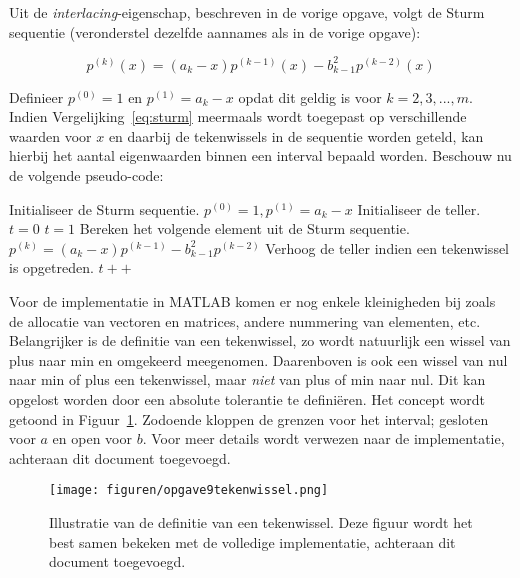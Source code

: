 \documentclass[a4paper, 12pt, titlepage]{report}
\begin{document}
Uit de \emph{interlacing}-eigenschap, beschreven in de vorige opgave, volgt de Sturm sequentie (veronderstel dezelfde aannames als in de vorige opgave):

\begin{equation}
	p^{(k)}(x) = (a_k - x)p^{(k-1)}(x)-b_{k-1}^{2}p^{(k-2)}(x)
	\label{eq:sturm}
\end{equation}

Definieer $p^{(0)}=1$ en $p^{(1)}=a_k-x$ opdat dit geldig is voor $k = 2,3,...,m$. Indien Vergelijking~\ref{eq:sturm} meermaals wordt toegepast op verschillende waarden voor $x$ en daarbij de tekenwissels in de sequentie worden geteld, kan hierbij het aantal eigenwaarden binnen een interval bepaald worden. Beschouw nu de volgende pseudo-code:\\

\begin{algorithmic}
\STATE Initialiseer de Sturm sequentie.
\STATE $p^{(0)}=1, p^{(1)}=a_k-x$
\STATE Initialiseer de teller.
\STATE $t = 0$
\STATE $t = 1$
\ENDIF	
{}
\STATE Bereken het volgende element uit de Sturm sequentie.
\STATE $p^{(k)} = (a_k - x)p^{(k-1)}-b_{k-1}^{2}p^{(k-2)}$
\STATE Verhoog de teller indien een tekenwissel is opgetreden.
\STATE  $t++$
\ENDIF
\ENDFOR
\end{algorithmic}

Voor de implementatie in MATLAB komen er nog enkele kleinigheden bij zoals de allocatie van vectoren en matrices, andere nummering van elementen, etc. Belangrijker is de definitie van een tekenwissel, zo wordt natuurlijk een wissel van plus naar min en omgekeerd meegenomen. Daarenboven is ook een wissel van nul naar min of plus een tekenwissel, maar \emph{niet} van plus of min naar nul. Dit kan opgelost worden door een absolute tolerantie te defini\"eren. Het concept wordt getoond in Figuur~\ref{fig:opgave9tekenwissel}. Zodoende kloppen de grenzen voor het interval; gesloten voor $a$ en open voor $b$. Voor meer details wordt verwezen naar de implementatie, achteraan dit document toegevoegd.

\begin{figure}[htb]
	\centering
	\texttt{[image: figuren/opgave9tekenwissel.png]}
	\caption{Illustratie van de definitie van een tekenwissel. Deze figuur wordt het best samen bekeken met de volledige implementatie, achteraan dit document toegevoegd.}
	\label{fig:opgave9tekenwissel}
\end{figure}
\end{document}
